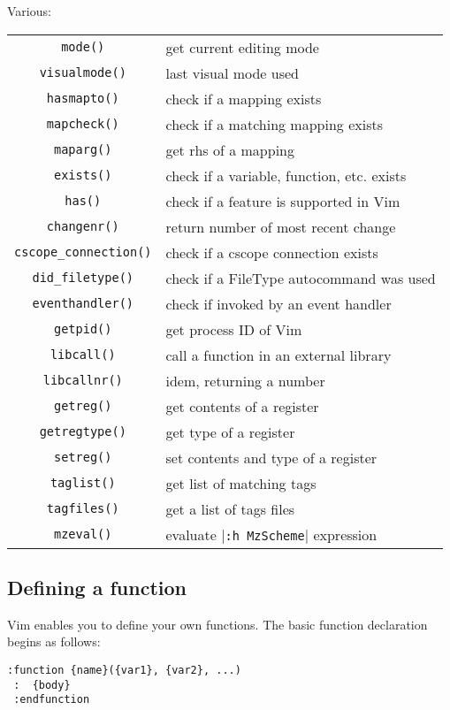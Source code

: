 Various:
\label{various-functions}
\begin{center} \begin{tabular}{c l}
				\verb!mode()! & get current editing mode \\
				\verb!visualmode()! & last visual mode used \\
				\verb!hasmapto()! & check if a mapping exists \\
				\verb!mapcheck()! & check if a matching mapping exists \\
				\verb!maparg()! & get rhs of a mapping \\
				\verb!exists()! & check if a variable, function, etc. exists \\
				\verb!has()! & check if a feature is supported in Vim \\
				\verb!changenr()! & return number of most recent change \\
				\verb!cscope_connection()! & check if a cscope connection exists \\
				\verb!did_filetype()! & check if a FileType autocommand was used \\
				\verb!eventhandler()! & check if invoked by an event handler \\
				\verb!getpid()! & get process ID of Vim \\
				\verb!libcall()! & call a function in an external library \\
				\verb!libcallnr()! & idem, returning a number \\
				\verb!getreg()! & get contents of a register \\
				\verb!getregtype()! & get type of a register \\
				\verb!setreg()! & set contents and type of a register \\
				\verb!taglist()! & get list of matching tags \\
				\verb!tagfiles()! & get a list of tags files \\
				\verb!mzeval()! & evaluate |\verb!:h MzScheme!| expression \\
\end{tabular} \end{center}
\subsection{Defining a function}
Vim enables you to define your own functions.
The basic function declaration begins as follows:

\begin{Verbatim}[samepage=true]
 :function {name}({var1}, {var2}, ...)
 :  {body}
 :endfunction
\end{Verbatim}


